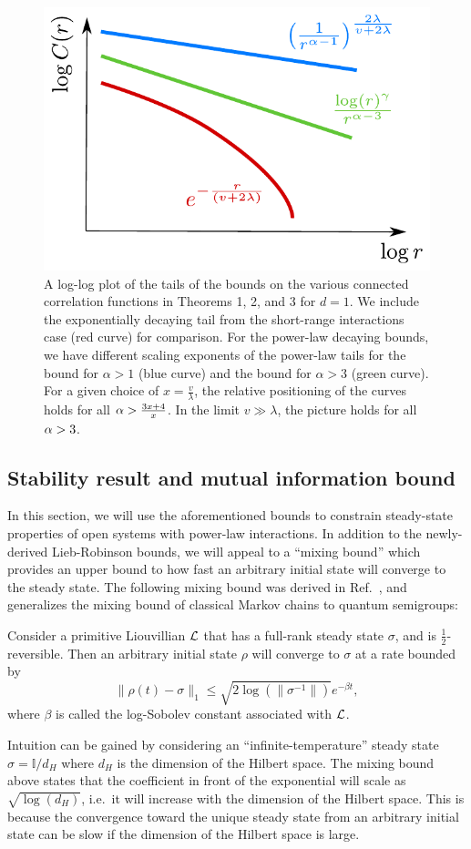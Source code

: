 \begin{figure}[h]
\centering
\label{fig:model1}
\includegraphics[width=.45\textwidth]{figures/light-cones-log.pdf}
\caption{A log-log plot of the tails of the bounds on the various connected correlation functions in Theorems 1, 2, and 3 for $d = 1$. We include the exponentially decaying tail from the short-range interactions case (red curve) for comparison.
For the power-law decaying bounds, we have different scaling exponents of the power-law tails for the bound for $\alpha >1$ (blue curve) and the bound for $\alpha > 3$ (green curve).
For a given choice of $x = \frac v\lambda$, the relative positioning of the curves
holds for all $\alpha > \frac{3x+4}{x}$.
In the limit $v \gg \lambda$, the picture holds for all $\alpha > 3$.}
  \label{fig:light-cone-scalings}
\end{figure}

\subsection{Stability result and mutual information bound}
In this section, we will  use the aforementioned bounds to constrain steady-state properties of open systems with power-law interactions.
In addition to the newly-derived Lieb-Robinson bounds,  we will  appeal to a ``mixing bound'' which provides an upper bound to how fast an arbitrary initial state will converge to the steady state. The following mixing bound was derived in Ref.~\cite{Kastoryano2013d}, and generalizes the mixing bound of classical Markov chains to quantum semigroups:

\begin{lemma}
  \label{cor:mixing}
    Consider a  primitive Liouvillian $\mathcal{L}$ that has a  full-rank steady state  $\sigma$, and is $\frac12$-reversible. Then an arbitrary initial state $\rho$ will converge to $\sigma$ at a rate bounded by
    \begin{equation}
        \lVert \rho(t) - \sigma \lVert_1 \leq \sqrt{2 \log( \lVert \sigma^{-1} \lVert )} e^{-\beta t},
    \end{equation}
    where $\beta$ is called the log-Sobolev constant associated with $\mathcal{L}$.
\end{lemma}
Intuition can be gained by considering an  ``infinite-temperature'' steady state $\sigma = \mathbb{I} /
d_{H}$ where $ d_{H}$ is the dimension of the Hilbert space.  The mixing bound above states that the coefficient in front of the exponential will  scale as $\sqrt{\log(d_{H})}$, i.e.~it will increase with the dimension of the Hilbert space. This is because the convergence toward the unique steady state from an arbitrary initial state can be slow if the dimension of the Hilbert space is large.


